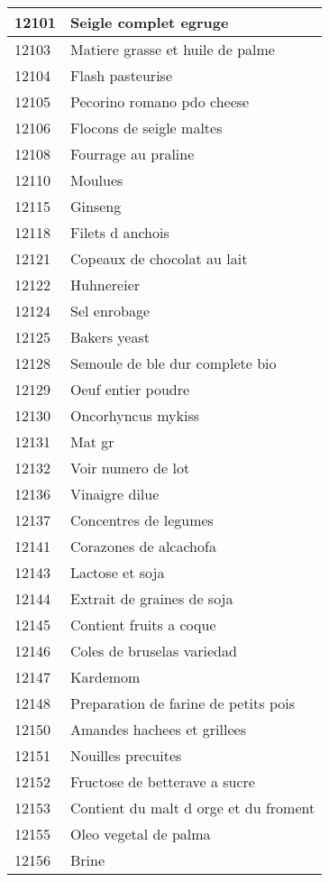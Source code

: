 \begin{longtable}{|l|l|}
12101 & Seigle complet egruge \\ \hline 
12103 & Matiere grasse et huile de palme \\ \hline 
12104 & Flash pasteurise \\ \hline 
12105 & Pecorino romano pdo cheese \\ \hline 
12106 & Flocons de seigle maltes \\ \hline 
12108 & Fourrage au praline \\ \hline 
12110 & Moulues \\ \hline 
12115 & Ginseng \\ \hline 
12118 & Filets d anchois \\ \hline 
12121 & Copeaux de chocolat au lait \\ \hline 
12122 & Huhnereier \\ \hline 
12124 & Sel enrobage \\ \hline 
12125 & Bakers yeast \\ \hline 
12128 & Semoule de ble dur complete bio \\ \hline 
12129 & Oeuf entier poudre \\ \hline 
12130 & Oncorhyncus mykiss \\ \hline 
12131 & Mat gr \\ \hline 
12132 & Voir numero de lot \\ \hline 
12136 & Vinaigre dilue \\ \hline 
12137 & Concentres de legumes \\ \hline 
12141 & Corazones de alcachofa \\ \hline 
12143 & Lactose et soja \\ \hline 
12144 & Extrait de graines de soja \\ \hline 
12145 & Contient fruits a coque \\ \hline 
12146 & Coles de bruselas variedad \\ \hline 
12147 & Kardemom \\ \hline 
12148 & Preparation de farine de petits pois \\ \hline 
12150 & Amandes hachees et grillees \\ \hline 
12151 & Nouilles precuites \\ \hline 
12152 & Fructose de betterave a sucre \\ \hline 
12153 & Contient du malt d orge et du froment \\ \hline 
12155 & Oleo vegetal de palma \\ \hline 
12156 & Brine \\ \hline 

\end{longtable}

